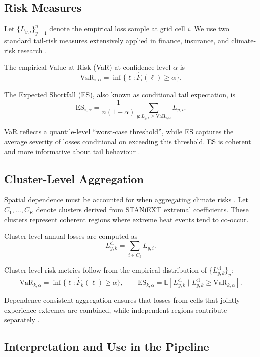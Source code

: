 \documentclass[12pt]{article}
\newcommand{\VaR}{\mathrm{VaR}}
\newcommand{\ES}{\mathrm{ES}}
\begin{document}
\subsection{Risk Measures}

Let $\{L_{y,i}\}_{y=1}^n$ denote the empirical loss sample at grid cell $i$. We use two
standard tail-risk measures extensively applied in finance, insurance, and climate-risk
research \citep{acerbi2002coherence, mcneil2015quantitative}.

The empirical Value-at-Risk (VaR) at confidence level $\alpha$ is
\[
\VaR_{i,\alpha} = \inf \{ \ell : \widehat{F}_{i}(\ell) \ge \alpha \}.
\]

The Expected Shortfall (ES), also known as conditional tail expectation, is
\[
\ES_{i,\alpha}
=
\frac{1}{n(1-\alpha)} \sum_{y : L_{y,i} \ge \VaR_{i,\alpha}} L_{y,i}.
\]

VaR reflects a quantile-level “worst-case threshold”, while ES captures the average
severity of losses conditional on exceeding this threshold. ES is coherent and more
informative about tail behaviour \citep{acerbi2002coherence}.

\subsection{Cluster-Level Aggregation}

Spatial dependence must be accounted for when aggregating climate risks
\citep{koch2020spatialrisk, cooley2019extreme}. Let $C_1,\dots,C_K$ denote clusters
derived from STANiEXT extremal coefficients. These clusters represent coherent regions
where extreme heat events tend to co-occur.

Cluster-level annual losses are computed as
\[
L^{\mathrm{cl}}_{y,k} = \sum_{i \in C_k} L_{y,i}.
\]

Cluster-level risk metrics follow from the empirical distribution of
$\{L^{\mathrm{cl}}_{y,k}\}_y$:
\[
\VaR_{k,\alpha} = \inf \{\ell : \widehat{F}_k(\ell) \ge \alpha\},
\qquad
\ES_{k,\alpha} = \mathbb{E}[L^{\mathrm{cl}}_{y,k} \mid L^{\mathrm{cl}}_{y,k} \ge \VaR_{k,\alpha} ].
\]

Dependence-consistent aggregation ensures that losses from cells that jointly experience
extremes are combined, while independent regions contribute separately
\citep{koch2020spatialrisk}.

\subsection{Interpretation and Use in the Pipeline}
\end{document}

